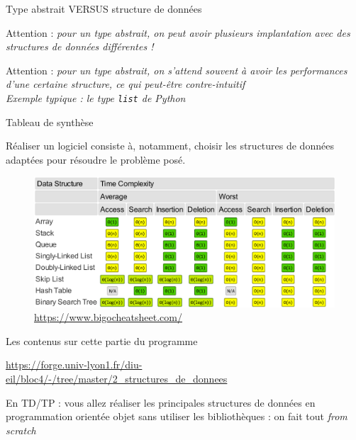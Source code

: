 \documentclass[table]{beamer}
\begin{document}
\begin{frame}{Type abstrait VERSUS structure de données}



\begin{center}
  \alert{Attention} :\emph{ pour un type abstrait, on peut avoir plusieurs implantation avec des structures de données différentes !}
\end{center}

\pause
\begin{center}
  \alert{Attention} : \emph{pour un type abstrait, on \og{}s'attend\fg{} souvent à avoir les performances d'une certaine structure, ce qui peut-être contre-intuitif\\
  Exemple typique : le type \texttt{list} de Python}
\end{center}



\end{frame}




\begin{frame}{Tableau de synthèse}

\begin{center}
  Réaliser un logiciel consiste à, notamment, choisir \alert{les structures de données adaptées} pour résoudre le problème posé.
\end{center}


    \begin{figure}
      \centering
      \includegraphics[width=0.9\linewidth]{./bigocheatsheet.png}%
      \caption{\url{https://www.bigocheatsheet.com/}}
    \end{figure}
  
\end{frame}


\begin{frame}{Les contenus sur cette partie du programme}
  
\begin{center}
    \url{https://forge.univ-lyon1.fr/diu-eil/bloc4/-/tree/master/2_structures_de_donnees}
    
    En TD/TP :  vous allez réaliser les principales structures de données en programmation orientée objet \alert{sans utiliser les bibliothèques} : on fait tout \emph{from scratch}
    
\end{center}
  

  
\end{frame}



\end{document}
